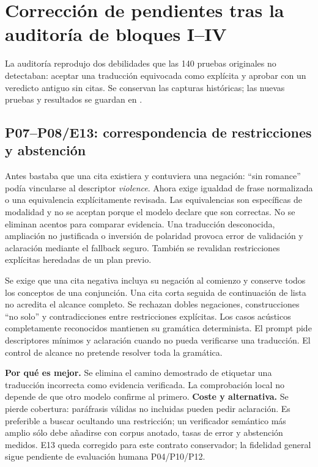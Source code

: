 \section{Corrección de pendientes tras la auditoría de bloques I--IV}
\label{sec:correcciones_pendientes}
La auditoría reprodujo dos debilidades que las 140 pruebas originales no
detectaban: aceptar una traducción equivocada como explícita y aprobar con un
veredicto antiguo sin citas. Se conservan las capturas históricas; las nuevas
pruebas y resultados se guardan en .

\subsection{P07--P08/E13: correspondencia de restricciones y abstención}
Antes bastaba que una cita existiera y contuviera una negación: ``sin romance''
podía vincularse al descriptor \emph{violence}. Ahora  exige
igualdad de frase normalizada o una equivalencia explícitamente revisada. Las
equivalencias son específicas de modalidad y no se aceptan porque el modelo
declare que son correctas. No se eliminan acentos para comparar evidencia.
Una traducción desconocida, ampliación no justificada o inversión de polaridad
provoca error de validación y aclaración mediante el fallback seguro. También
se revalidan restricciones explícitas heredadas de un plan previo.

Se exige que una cita negativa incluya su negación al comienzo y conserve todos
los conceptos de una conjunción. Una cita corta seguida de continuación de lista
no acredita el alcance completo. Se rechazan dobles negaciones, construcciones
``no solo'' y contradicciones entre restricciones explícitas. Los casos
acústicos completamente reconocidos mantienen su gramática determinista.
El prompt pide descriptores mínimos y aclaración cuando no pueda verificarse
una traducción. El control de alcance no pretende resolver toda la gramática.

\textbf{Por qué es mejor.} Se elimina el camino demostrado de etiquetar una
traducción incorrecta como evidencia verificada. La comprobación local no depende
de que otro modelo confirme al primero. \textbf{Coste y alternativa.} Se pierde
cobertura: paráfrasis válidas no incluidas pueden pedir aclaración. Es preferible
a buscar ocultando una restricción; un verificador semántico más amplio sólo debe
añadirse con corpus anotado, tasas de error y abstención medidos. E13 queda
corregido para este contrato conservador; la fidelidad general sigue pendiente
de evaluación humana P04/P10/P12.

